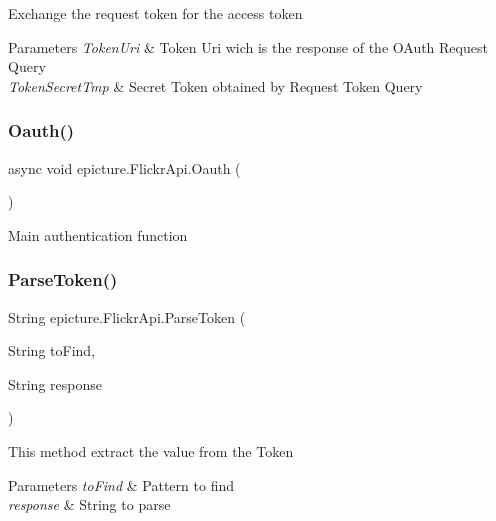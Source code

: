 Exchange the request token for the access token 
\begin{DoxyParams}{Parameters}
{\em Token\+Uri} & Token Uri wich is the response of the O\+Auth Request Query \\
\hline
{\em Token\+Secret\+Tmp} & Secret Token obtained by Request Token Query \\
\hline
\end{DoxyParams}
\mbox{\label{classepicture_1_1_flickr_api_a148c12d8328b94be08a554a45a546fc1}} 
\subsubsection{\texorpdfstring{Oauth()}{Oauth()}}
{\footnotesize\ttfamily async void epicture.\+Flickr\+Api.\+Oauth (\begin{DoxyParamCaption}{ }\end{DoxyParamCaption})}

Main authentication function \mbox{\label{classepicture_1_1_flickr_api_a9ab15abcbe6c3002eb753dd79aa587ae}} 
\subsubsection{\texorpdfstring{Parse\+Token()}{ParseToken()}}
{\footnotesize\ttfamily String epicture.\+Flickr\+Api.\+Parse\+Token (\begin{DoxyParamCaption}\item[{String}]{to\+Find,  }\item[{String}]{response }\end{DoxyParamCaption})\hspace{0.3cm}{\ttfamily [private]}}

This method extract the value from the Token 
\begin{DoxyParams}{Parameters}
{\em to\+Find} & Pattern to find \\
\hline
{\em response} & String to parse \\
\hline
\end{DoxyParams}
\mbox{\label{classepicture_1_1_flickr_api_ae914f2cefba1eb20021af69115471626}} 
